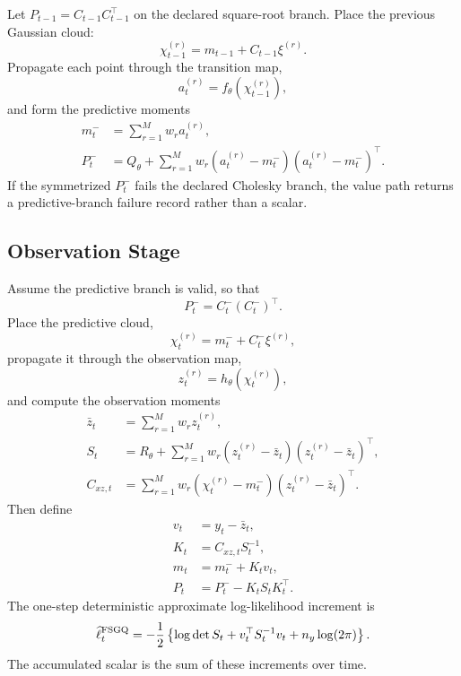 \documentclass[11pt]{article}
\numberwithin{equation}{section}
\newcommand{\ellhat}{\widehat\ell}
\begin{document}
Let \(P_{t-1}=C_{t-1}C_{t-1}^\top\) on the declared square-root branch.  Place
the previous Gaussian cloud:
\begin{equation}
  \chi_{t-1}^{(r)}=m_{t-1}+C_{t-1}\xi^{(r)}.
  \label{eq:p31-pred-placed-points}
\end{equation}
Propagate each point through the transition map,
\begin{equation}
  a_t^{(r)}=f_\theta(\chi_{t-1}^{(r)}),
  \label{eq:p31-transition-points}
\end{equation}
and form the predictive moments
\begin{align}
  m_t^- &= \sum_{r=1}^{M} w_r a_t^{(r)},
  \label{eq:p31-pred-mean}\\
  P_t^- &= Q_\theta +
  \sum_{r=1}^{M}w_r(a_t^{(r)}-m_t^-)(a_t^{(r)}-m_t^-)^\top.
  \label{eq:p31-pred-cov}
\end{align}
If the symmetrized \(P_t^-\) fails the declared Cholesky branch, the value path
returns a predictive-branch failure record rather than a scalar.

\subsection{Observation Stage}

Assume the predictive branch is valid, so that
\begin{equation}
  P_t^-=C_t^-(C_t^-)^\top.
  \label{eq:p31-pred-factor}
\end{equation}
Place the predictive cloud,
\begin{equation}
  \chi_t^{(r)}=m_t^-+C_t^-\xi^{(r)},
  \label{eq:p31-obs-placed-points}
\end{equation}
propagate it through the observation map,
\begin{equation}
  z_t^{(r)}=h_\theta(\chi_t^{(r)}),
  \label{eq:p31-obs-values}
\end{equation}
and compute the observation moments
\begin{align}
  \bar z_t &= \sum_{r=1}^{M}w_r z_t^{(r)},
  \label{eq:p31-obs-mean}\\
  S_t &= R_\theta+
  \sum_{r=1}^{M}w_r(z_t^{(r)}-\bar z_t)(z_t^{(r)}-\bar z_t)^\top,
  \label{eq:p31-S-cloud}\\
  C_{xz,t} &= \sum_{r=1}^{M}w_r(\chi_t^{(r)}-m_t^-)(z_t^{(r)}-\bar z_t)^\top.
  \label{eq:p31-cross-cov}
\end{align}
Then define
\begin{align}
  v_t &= y_t-\bar z_t,
  \label{eq:p31-innovation}\\
  K_t &= C_{xz,t}S_t^{-1},
  \label{eq:p31-kalman-gain}\\
  m_t &= m_t^-+K_t v_t,
  \label{eq:p31-filter-mean}\\
  P_t &= P_t^- - K_tS_tK_t^\top.
  \label{eq:p31-filter-cov}
\end{align}
The one-step deterministic approximate log-likelihood increment is
\begin{equation}
  \ellhat_t^{\rm FSGQ}
  =
  -\frac12
  \left\{
    \log\det S_t + v_t^\top S_t^{-1}v_t + n_y\log(2\pi)
  \right\}.
  \label{eq:p31-fsgq-loglik}
\end{equation}
The accumulated scalar is the sum of these increments over time.
\end{document}
